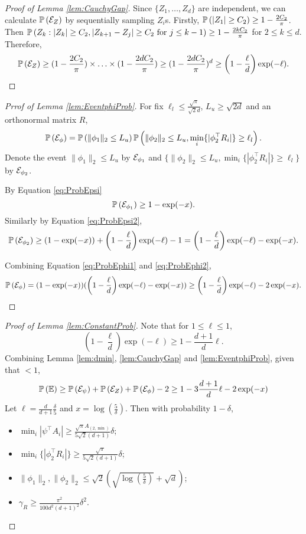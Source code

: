 \begin{proof}[Proof of Lemma \ref{lem:CauchyGap}]
Since $\{Z_1,\ldots, Z_d\}$ are independent, we can calculate $\mathbb{P}\left(\mathcal{E}_{Z}\right)$ by sequentially sampling $Z_i$s. 
Firstly, $\mathbb{P}\left(|Z_1|\ge C_2\right) \ge 1-\frac{2C_2}{\pi}$. 
Then $\mathbb{P}\left(Z_{k}: |Z_{k}|\ge C_2, |Z_{k+1}- Z_j|\ge C_2 \text{ for } j\le k-1\right) \ge 1-\frac{2kC_2}{\pi}$ for $2 \le k\le d$.
Therefore,
\begin{equation}
\label{eq:ProbEZ}
\mathbb{P}\left(\mathcal{E}_{Z}\right) \ge (1-\frac{2C_2}{\pi})\times \ldots \times (1-\frac{2dC_2}{\pi}) \ge (1-\frac{2dC_2}{\pi})^d \ge \left(1- \frac{\ell}{d}\right)\exp(-\ell).
\end{equation}
\end{proof}

\begin{proof}[Prrof of Lemma \ref{lem:EventphiProb}]
For fix $\ell_l\le \frac{\sqrt{\pi}}{\sqrt{2}d}$, $L_u \ge \sqrt{2d}$ and an orthonormal matrix $R$, 
\[
\mathbb{P}\left(\mathcal{E}_{\phi}\right) = \mathbb{P}\left(\|\phi_1\|_2\le L_u\right)\mathbb{P}\left(\|\phi_2\|_2\le L_u, \min_i \{|\phi_2^{\top}R_i|\} \ge \ell_l\right).
\]
Denote the event $\|\phi_1\|_2\le L_u$ by $\mathcal{E}_{\phi_1}$ and $\{\|\phi_2\|_2\le L_u, \min_i \{|\phi_2^{\top}R_i|\} \ge \ell_l\}$ by $\mathcal{E}_{\phi_2}$. 

By Equation \eqref{eq:ProbEpsi}
\begin{equation}
\label{eq:ProbEphi1}
\mathbb{P}\left(\mathcal{E}_{\phi_1}\right) \ge 1-\exp(-x).
\end{equation}
Similarly by Equation \eqref{eq:ProbEpsi2},
\begin{equation}
\label{eq:ProbEphi2}
\mathbb{P}\left(\mathcal{E}_{\phi_2}\right) \ge (1-\exp(-x))+\left(1- \frac{\ell}{d}\right)\exp(-\ell)-1 = \left(1- \frac{\ell}{d}\right)\exp(-\ell)-\exp(-x).
\end{equation}

Combining Equation \eqref{eq:ProbEphi1} and \eqref{eq:ProbEphi2},
\[
\mathbb{P}\left(\mathcal{E}_{\phi}\right) = (1-\exp(-x))(\left(1- \frac{\ell}{d}\right)\exp(-\ell)-\exp(-x)) \ge \left(1- \frac{\ell}{d}\right)\exp(-\ell) - 2\exp(-x).
\]
\end{proof}

\begin{proof}[Proof of Lemma \ref{lem:ConstantProb}]
Note that for $1\le \ell \le 1$, 
\[
\left(1- \frac{\ell}{d}\right)\exp(-\ell) \ge 1-\frac{d+1}{d}\ell.
\]
Combining Lemma \ref{lem:dmin}, \ref{lem:CauchyGap} and \ref{lem:EventphiProb}, given that $<1$,
\[
\mathbb{P}\left(\mathbb{E}\right) \ge \mathbb{P}\left(\mathcal{E}_{\psi}\right) + \mathbb{P}\left(\mathcal{E}_{Z}\right) + \mathbb{P}\left(\mathcal{E}_{\phi}\right) -2 \ge 1- 3\frac{d+1}{d}\ell- 2\exp(-x)  
\]
Let $\ell = \frac{d}{d+1}\frac{\delta}{5}$ and $ x= \log(\frac{5}{\delta})$.
Then with probability $1-\delta$, 
\begin{itemize}
\item $\min_i |\psi^{\top}A_i| \ge \frac{\sqrt{\pi}A_{(2,\min)}}{5\sqrt{2}(d+1)} \delta$;
\item $\min_i \{|\phi_2^{\top}R_i|\} \ge \frac{\sqrt{\pi}}{5\sqrt{2}(d+1)}\delta$;
\item $\|\phi_1\|_2, \|\phi_2\|_2 \le \sqrt{2}\left(\sqrt{\log(\frac{5}{\delta})}+\sqrt{d}\right)$;
\item $\gamma_R \ge\frac{\pi^2}{100d^2(d+1)^2}\delta^2$.
\end{itemize}
\end{proof}

